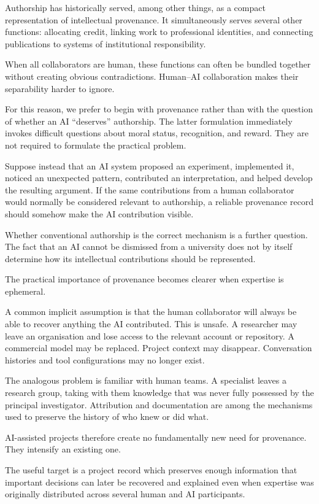 \documentclass[12pt]{article}
\begin{document}
Authorship has historically served, among other things, as a compact representation of intellectual provenance. It simultaneously serves several other functions: allocating credit, linking work to professional identities, and connecting publications to systems of institutional responsibility.

When all collaborators are human, these functions can often be bundled together without creating obvious contradictions. Human--AI collaboration makes their separability harder to ignore.

For this reason, we prefer to begin with provenance rather than with the question of whether an AI ``deserves'' authorship. The latter formulation immediately invokes difficult questions about moral status, recognition, and reward. They are not required to formulate the practical problem.

Suppose instead that an AI system proposed an experiment, implemented it, noticed an unexpected pattern, contributed an interpretation, and helped develop the resulting argument. If the same contributions from a human collaborator would normally be considered relevant to authorship, a reliable provenance record should somehow make the AI contribution visible.

Whether conventional authorship is the correct mechanism is a further question. The fact that an AI cannot be dismissed from a university does not by itself determine how its intellectual contributions should be represented.

The practical importance of provenance becomes clearer when expertise is ephemeral.

A common implicit assumption is that the human collaborator will always be able to recover anything the AI contributed. This is unsafe. A researcher may leave an organisation and lose access to the relevant account or repository. A commercial model may be replaced. Project context may disappear. Conversation histories and tool configurations may no longer exist.

The analogous problem is familiar with human teams. A specialist leaves a research group, taking with them knowledge that was never fully possessed by the principal investigator. Attribution and documentation are among the mechanisms used to preserve the history of who knew or did what.

AI-assisted projects therefore create no fundamentally new need for provenance. They intensify an existing one.

The useful target is a project record which preserves enough information that important decisions can later be recovered and explained even when expertise was originally distributed across several human and AI participants.
\end{document}

